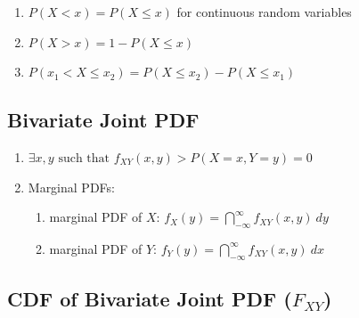 \begin{enumerate}
    \item $P(X < x) = P(X \leq x)$ for continuous random variables

    \item $P(X > x) = 1 - P(X \leq x)$
    \hfill \cite{statistics/book/Statistics-for-Data-Scientists/Maurits-Kaptein}

    \item $P( x_1 < X \leq x_2) = P(X \leq x_2) - P(X \leq x_1)$
    \hfill \cite{statistics/book/Statistics-for-Data-Scientists/Maurits-Kaptein}
\end{enumerate}




\subsection{Bivariate Joint PDF}

\begin{enumerate}
    \item $\exists x,y \text{ such that }  f_{XY}(x,y) > P(X = x, Y = y) = 0$
    \hfill \cite{statistics/book/Statistics-for-Data-Scientists/Maurits-Kaptein}

    \item Marginal PDFs:
    \begin{enumerate}
        \item marginal PDF of $X$: $f _X (y) = \dint^\infty _{-\infty} f _{X Y} (x, y)\ dy$
        \hfill \cite{statistics/book/Statistics-for-Data-Scientists/Maurits-Kaptein}

        \item marginal PDF of $Y$: $f _Y (y) = \dint^\infty _{-\infty} f _{X Y} (x, y)\ dx$
        \hfill \cite{statistics/book/Statistics-for-Data-Scientists/Maurits-Kaptein}
    \end{enumerate}

\end{enumerate}


\subsection{CDF of Bivariate Joint PDF ($F _{X Y}$)}

